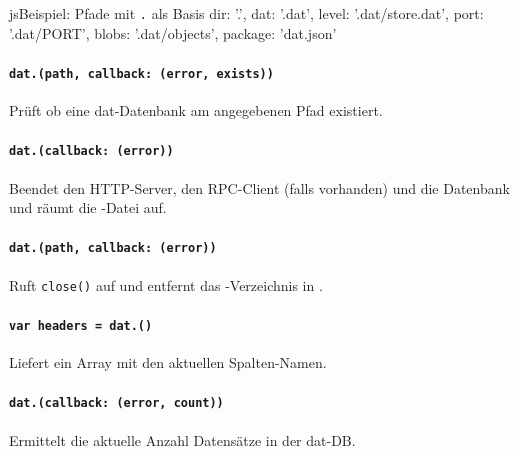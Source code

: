 \begin{srclst}{js}{Beispiel: Pfade mit \texttt{.} als Basis}
{ 
    dir: '.',
    dat: '.dat',
    level: '.dat/store.dat',
    port: '.dat/PORT',
    blobs: '.dat/objects',
    package: 'dat.json' 
}
\end{srclst}

\paragraph{\texttt{dat.(path, callback: (error, exists))}}
Prüft ob eine dat-Datenbank am angegebenen Pfad existiert.

\paragraph{\texttt{dat.(callback: (error))}}
Beendet den HTTP-Server, den RPC-Client (falls vorhanden) und die Datenbank und räumt die -Datei auf.

\paragraph{\texttt{dat.(path, callback: (error))}}
Ruft \texttt{close()} auf und entfernt das -Verzeichnis in .

\paragraph{\texttt{var headers = dat.()}}
Liefert ein Array mit den aktuellen Spalten-Namen.

\paragraph{\texttt{dat.(callback: (error, count))}}
Ermittelt die aktuelle Anzahl Datensätze in der dat-DB.



